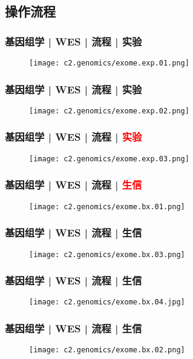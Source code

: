 \subsection{操作流程}
\begin{frame}
  \frametitle{基因组学 | WES | 流程 | 实验}
  \begin{figure}
    \centering
    \texttt{[image: c2.genomics/exome.exp.01.png]}
  \end{figure}
\end{frame}

\begin{frame}
  \frametitle{基因组学 | WES | 流程 | 实验}
  \begin{figure}
    \centering
    \texttt{[image: c2.genomics/exome.exp.02.png]}
  \end{figure}
\end{frame}

\begin{frame}
  \frametitle{基因组学 | WES | 流程 | \textcolor{red}{实验}}
  \begin{figure}
    \centering
    \texttt{[image: c2.genomics/exome.exp.03.png]}
  \end{figure}
\end{frame}

\begin{frame}
  \frametitle{基因组学 | WES | 流程 | \textcolor{red}{生信}}
  \begin{figure}
    \centering
    \texttt{[image: c2.genomics/exome.bx.01.png]}
  \end{figure}
\end{frame}

\begin{frame}
  \frametitle{基因组学 | WES | 流程 | 生信}
  \begin{figure}
    \centering
    \texttt{[image: c2.genomics/exome.bx.03.png]}
  \end{figure}
\end{frame}

\begin{frame}
  \frametitle{基因组学 | WES | 流程 | 生信}
  \begin{figure}
    \centering
    \texttt{[image: c2.genomics/exome.bx.04.jpg]}
  \end{figure}
\end{frame}

\begin{frame}
  \frametitle{基因组学 | WES | 流程 | 生信}
  \begin{figure}
    \centering
    \texttt{[image: c2.genomics/exome.bx.02.png]}
  \end{figure}
\end{frame}

